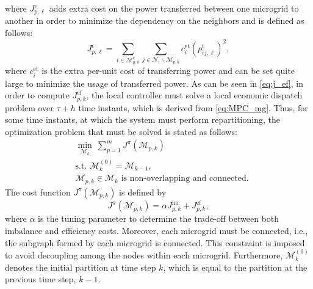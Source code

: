 where $J_{p,\ell}^{{\epsilon}}$ adds extra cost on the power transferred between one microgrid to another in order to minimize the dependency on the neighbors and is defined as follows:
\begin{equation}
J_{p,\ell}^{{\epsilon}} = \sum_{i\in \mathcal{M}_{p,k}^{\mathrm{c}}} \sum_{j \in \mathcal{N}_i\backslash\mathcal{M}_{p,k}} c_{i}^{\mathrm{et}}(p_{ij,\ell}^{\mathrm{t}})^2,
\label{eq:J_eps}
\end{equation}
where $c_{i}^{\mathrm{et}}$ is the extra per-unit cost of transferring power and can be set quite large to minimize the usage of transferred power. As can be seen in \eqref{eq:j_ef}, in order to compute $J_{p,k}^{\mathrm{ef}}$, the local controller must solve a local economic dispatch problem over $\tau+h$ time instants, which is derived from \eqref{eq:MPC_mg}.  
\fi
Thus, for some time instants, at which the system must perform repartitioning,  the optimization problem that   must be solved is stated as follows: 
\begin{equation}
	\begin{aligned}
	&\min_{\boldsymbol{\mathcal{M}}_k}  \ \sum_{p=1}^m J^{\pi}(\mathcal{M}_{p,k})\\
	& \text{s.t. } \boldsymbol{\mathcal{M}}^{(0)}_k = \boldsymbol{\mathcal{M}}_{k-1},\\
	& \mathcal{M}_{p,k} \in \boldsymbol{\mathcal{M}}_k \text{ is non-overlapping and connected}.%
	\end{aligned}
	\label{eq:part_prob}%
\end{equation}
The cost function $J^{\pi}(\mathcal{M}_{p,k})$ is defined by 
\begin{equation}
J^{\pi}(\mathcal{M}_{p,k})= \alpha J_{p,k}^{\mathrm{im}} + J_{p,k}^{\mathrm{ef}}, 
\label{eq:j_pi}
\end{equation}
where $\alpha$ is the tuning parameter to determine the trade-off between both imbalance and efficiency costs. %
Moreover, each microgrid must be connected, i.e., the subgraph formed by each microgrid is connected. This constraint is imposed to avoid decoupling among the nodes within each microgrid. 
Furthermore, $\boldsymbol{\mathcal{M}}^{(0)}_k$ denotes the initial partition at time step $k$, which is equal to the partition at the previous time step, $k-1$. %
